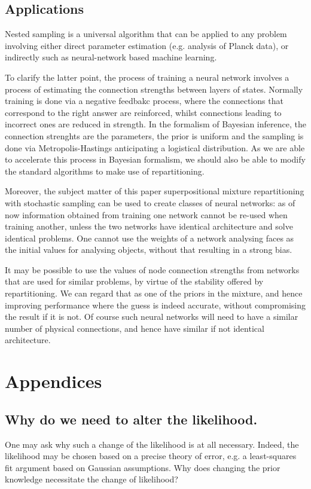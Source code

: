 \documentclass[usenatbib]{mnras}
\begin{document}
\subsection{Applications}
\label{sec:org5fc53c7}
Nested sampling is a universal algorithm that can be applied to any
problem involving either direct parameter estimation (e.g. analysis
of Planck data), or indirectly such as neural-network based machine
learning.

To clarify the latter point, the process of training a neural
network involves a process of estimating the connection strengths
between layers of states. Normally training is done via a negative
feedbakc process, where the connections that correspond to the
right answer are reinforced, whilst connections leading to
incorrect ones are reduced in strength. In the formalism of
Bayesian inference, the connection strenghts are the parameters,
the prior is uniform and the sampling is done via
Metropolis-Hastings anticipating a logistical distribution. As we
are able to accelerate this process in Bayesian formalism, we
should also be able to modify the standard algorithms to make use
of repartitioning.

Moreover, the subject matter of this paper superpositional mixture
repartitioning with stochastic sampling can be used to create
classes of neural networks: as of now information obtained from
training one network cannot be re-used when training another,
unless the two networks have identical architecture and solve
identical problems. One cannot use the weights of a network
analysing faces as the initial values for analysing objects,
without that resulting in a strong bias. 

It may be possible to use the values of node connection strengths
from networks that are used for similar problems, by virtue of the
stability offered by repartitioning. We can regard that as one of
the priors in the mixture, and hence improving performance where
the guess is indeed accurate, without compromising the result if it
is not. Of course such neural networks will need to have a similar
number of physical connections, and hence have similar if not
identical architecture.

 


\section{Appendices}
\label{sec:orgdbad8c6}

\subsection{Why do we need to alter the likelihood.}
\label{sec:org34b36b8}
One may ask why such a change of the likelihood is at all
necessary. Indeed, the likelihood may be chosen based on a precise
theory of error, e.g. a least-squares fit argument based on
Gaussian assumptions. Why does changing the prior knowledge
necessitate the change of likelihood?
\end{document}
